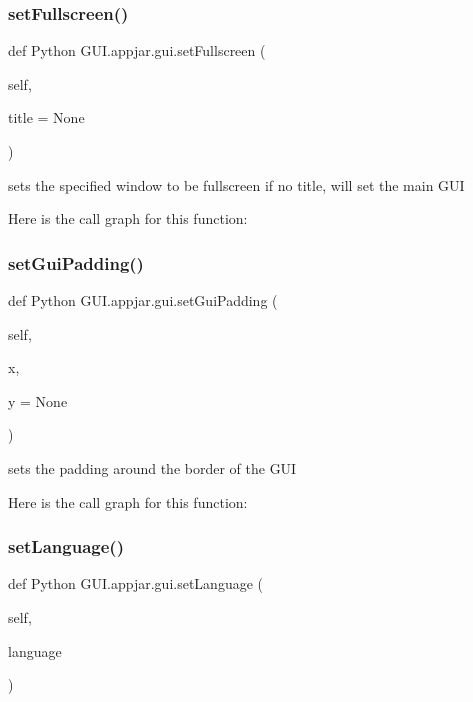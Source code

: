 \begin{DoxyVerb}
\subsubsection{\texorpdfstring{set\+Fullscreen()}{setFullscreen()}}
{\footnotesize\ttfamily def Python G\+U\+I.\+appjar.\+gui.\+set\+Fullscreen (\begin{DoxyParamCaption}\item[{}]{self,  }\item[{}]{title = {\ttfamily None} }\end{DoxyParamCaption})}

\begin{DoxyVerb}sets the specified window to be fullscreen
    if no title, will set the main GUI \end{DoxyVerb}
 Here is the call graph for this function\+:
\mbox{\label{class_python_01_g_u_i_1_1appjar_1_1gui_a1f752d12d96876ddfee57ad98c1d3d71}} 
\subsubsection{\texorpdfstring{set\+Gui\+Padding()}{setGuiPadding()}}
{\footnotesize\ttfamily def Python G\+U\+I.\+appjar.\+gui.\+set\+Gui\+Padding (\begin{DoxyParamCaption}\item[{}]{self,  }\item[{}]{x,  }\item[{}]{y = {\ttfamily None} }\end{DoxyParamCaption})}

\begin{DoxyVerb}sets the padding around the border of the GUI \end{DoxyVerb}
 Here is the call graph for this function\+:
\mbox{\label{class_python_01_g_u_i_1_1appjar_1_1gui_ab0a8df2b72875b971b6a19e91e7c9c3d}} 
\subsubsection{\texorpdfstring{set\+Language()}{setLanguage()}}
{\footnotesize\ttfamily def Python G\+U\+I.\+appjar.\+gui.\+set\+Language (\begin{DoxyParamCaption}\item[{}]{self,  }\item[{}]{language }\end{DoxyParamCaption})}


\end{DoxyVerb}
